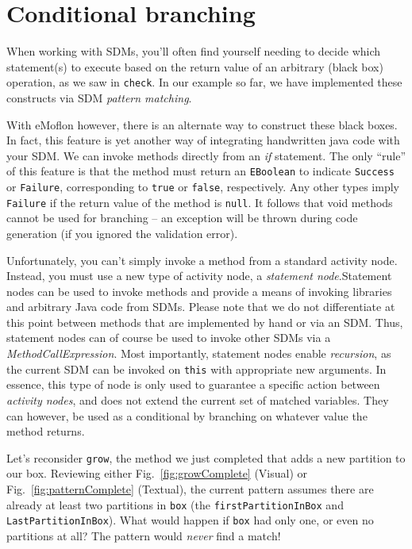 \newpage
\hypertarget{sec:conBran}{}
\section{Conditional branching}
\genHeader

When working with SDMs, you'll often find yourself needing to decide which statement(s) to execute based on the return value of an arbitrary (black box)
operation, as we saw in \texttt{check}. In our example so far, we have implemented these constructs via SDM \emph{pattern matching}. 

With eMoflon however, there is an alternate way to construct these black boxes. In fact, this feature is yet another way of integrating handwritten java code
with your SDM. We can invoke methods directly from an \emph{if} statement. The only ``rule'' of this feature is that the method must return an
\texttt{EBoolean} to indicate \texttt{Success} or \texttt{Failure}, corresponding to \texttt{true} or \texttt{false}, respectively. Any other types imply
\texttt{Failure} if the return value of the method is \texttt{null}. It follows that void methods cannot be used for branching -- an exception will be thrown
during code generation (if you ignored the validation error).

Unfortunately, you can't simply invoke a method from a standard activity node. Instead, you must use a new type of activity node, a \emph{statement
node}.Statement nodes can be used to invoke methods and provide a means of invoking libraries and
arbitrary Java code from SDMs. Please note that we do not differentiate at this point between methods that are implemented by hand or via an SDM. Thus,
statement nodes can of course be used to invoke other SDMs via a \emph{MethodCallExpression}. Most importantly, statement nodes enable \emph{recursion}, as the
current SDM can be invoked on \texttt{this} with appropriate new arguments. In essence, this type of node is only used to guarantee a specific action
between \emph{activity nodes}, and does not extend the current set of matched variables. They can however, be used as a conditional by branching on
whatever value the method returns.

Let's reconsider \texttt{grow}, the method we just completed that adds a new partition to our box. Reviewing either Fig.~\ref{fig:growComplete} (Visual) or
Fig.~\ref{fig:patternComplete} (Textual), the current pattern assumes there are already at least two partitions in \texttt{box} (the
\texttt{firstPartitionInBox} and \texttt{LastPartitionInBox}). What would happen if \texttt{box} had only one, or even no partitions at all? The pattern would
\emph{never} find a match!

